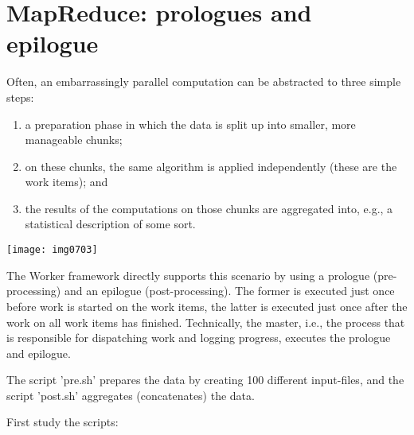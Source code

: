 \section{MapReduce: prologues and epilogue}

Often, an embarrassingly parallel computation can be abstracted to three simple steps:

\begin{enumerate}
\item  a preparation phase in which the data is split up into smaller, more manageable chunks;
\item  on these chunks, the same algorithm is applied independently (these are the work items); and
\item  the results of the computations on those chunks are aggregated into, e.g., a statistical description of some sort.
\end{enumerate}

\texttt{[image: img0703]}

The Worker framework directly supports this scenario by using a prologue (pre-processing) and an epilogue (post-processing). The former is executed just once before work is started on the work items, the latter is executed just once after the work on all work items has finished. Technically, the master, i.e., the process that is responsible for dispatching work and logging progress, executes the prologue and epilogue.

\begin{prompt}
$ %
\end{prompt}

The script 'pre.sh' prepares the data by creating 100 different input-files, and the script 'post.sh' aggregates (concatenates) the data.

First study the scripts:

